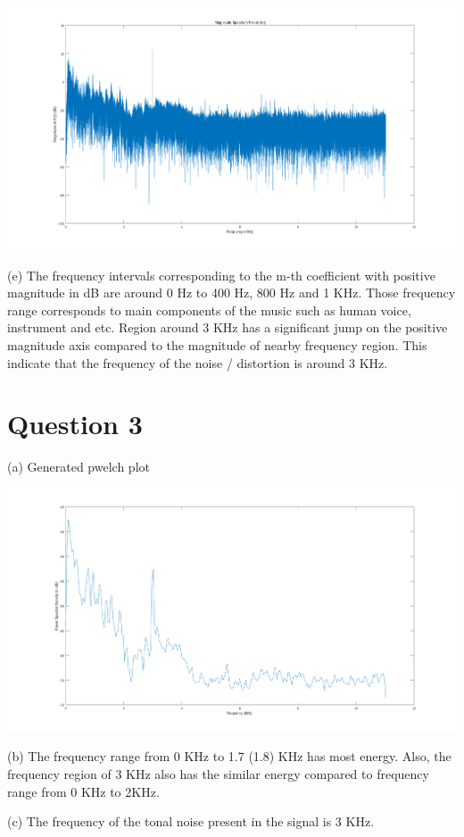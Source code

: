 \documentclass{article}
\begin{document}
\includegraphics[width=\textwidth]{q2.png}

(e) The frequency intervals corresponding to the m-th coefficient with positive magnitude in dB are around 0 Hz to 400 Hz, 800 Hz and 1 KHz. Those frequency range corresponds to main components of the music such as human voice, instrument and etc. Region around 3 KHz has a significant jump on the positive magnitude axis compared to the magnitude of nearby frequency region. This indicate that the frequency of the noise / distortion is around 3 KHz.

\section*{Question 3}

(a) Generated pwelch plot

\includegraphics[width=\textwidth]{q3.png}

(b) The frequency range from 0 KHz to 1.7 (1.8) KHz has most energy. Also, the frequency region of 3 KHz also has the similar energy compared to frequency range from 0 KHz to 2KHz.

(c) The frequency of the tonal noise present in the signal is 3 KHz.
\end{document}
